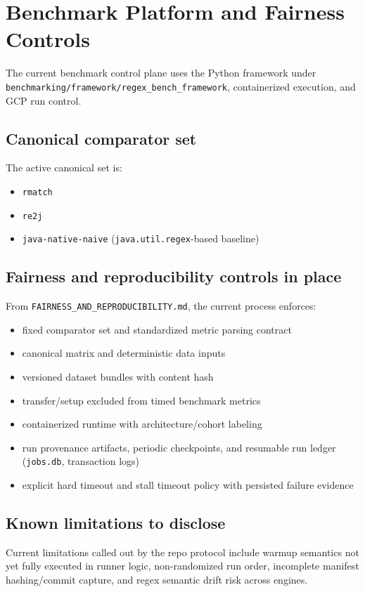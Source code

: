 \documentclass[11pt]{article}
\begin{document}
\section{Benchmark Platform and Fairness Controls}
The current benchmark control plane uses the Python framework under \texttt{benchmarking/framework/regex\_bench\_framework}, containerized execution, and GCP run control.

\subsection{Canonical comparator set}
The active canonical set is:
\begin{itemize}
  \item \texttt{rmatch}
  \item \texttt{re2j}
  \item \texttt{java-native-naive} (\texttt{java.util.regex}-based baseline)
\end{itemize}

\subsection{Fairness and reproducibility controls in place}
From \texttt{FAIRNESS\_AND\_REPRODUCIBILITY.md}, the current process enforces:
\begin{itemize}
  \item fixed comparator set and standardized metric parsing contract
  \item canonical matrix and deterministic data inputs
  \item versioned dataset bundles with content hash
  \item transfer/setup excluded from timed benchmark metrics
  \item containerized runtime with architecture/cohort labeling
  \item run provenance artifacts, periodic checkpoints, and resumable run ledger (\texttt{jobs.db}, transaction logs)
  \item explicit hard timeout and stall timeout policy with persisted failure evidence
\end{itemize}

\subsection{Known limitations to disclose}
Current limitations called out by the repo protocol include warmup semantics not yet fully executed in runner logic, non-randomized run order, incomplete manifest hashing/commit capture, and regex semantic drift risk across engines.
\end{document}
